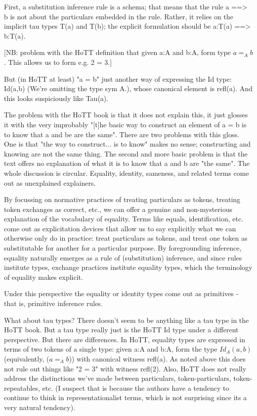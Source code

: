 \documentclass{article}
\begin{document}
First, a substitution inference rule is a schema; that means that the
rule a ==> b is not about the particulars embedded in the rule.
Rather, it relies on the implicit tau types T(a) and T(b); the
explicit formulation should be a:T(a) ==> b:T(a).

[NB: problem with the HoTT definition that given a:A and b:A, form
type \(a =_A b\).  This allows us to form e.g. 2 = 3.]

But (in HoTT at least) "a = b" just another way of expressing the Id
type: Id(a,b) (We're omitting the type sym A.), whose canonical
element is refl(a).  And this looks suspiciously like Tau(a).

The problem with the HoTT book is that it does not explain this, it
just glosses it with the very improbably "[t]he basic way to construct
an element of a = b is to know that a and be are the same".  There are
two problems with this gloss.  One is that "the way to construct... is
to know" makes no sense; constructing and knowing are not the same
thing.  The second and more basic problem is that the text offers no
explanation of what it is to know that a and b are "the same".  The
whole discussion is circular.  Equality, identity, sameness, and
related terms come out as unexplained explainers.

By focussing on normative practices of treating particulars as tokens,
treating token exchanges as correct, etc., we can offer a genuine and
non-mysterious explanation of the vocabulary of equality.  Terms like
equals, identification, etc. come out as explicitation devices that
allow us to say explicitly what we can otherwise only do in practice:
treat particulars as tokens, and treat one token as substitutable for
another for a particular purpose.  By foregrounding inference,
equality naturally emerges as a rule of (substitution) inference, and
since rules institute types, exchange practices institute equality
types, which the terminology of equality makes explicit.

Under this perspective the equality or identity types come out as
primitives - that is, primitive inference rules.

What about tau types?  There doesn't seem to be anything like a tau
type in the HoTT book.  But a tau type really just is the HoTT Id type
under a different perspective.  But there are differences.  In HoTT,
equality types are expressed in terms of two tokens of a single type:
given a:A and b:A, form the type \(Id_A(a,b)\) (equivalently, (\(a =_A b\)))
with canonical witness refl(a).  As noted above this does not rule out
things like "2 = 3" with witness refl(2).  Also, HoTT does not really
address the distinctions we've made between particulars,
token-particulars, token-repeatables, etc.  (I suspect that is because
the authors have a tendency to continue to think in
representationalist terms, which is not surprising since its a very
natural tendency).
\end{document}
